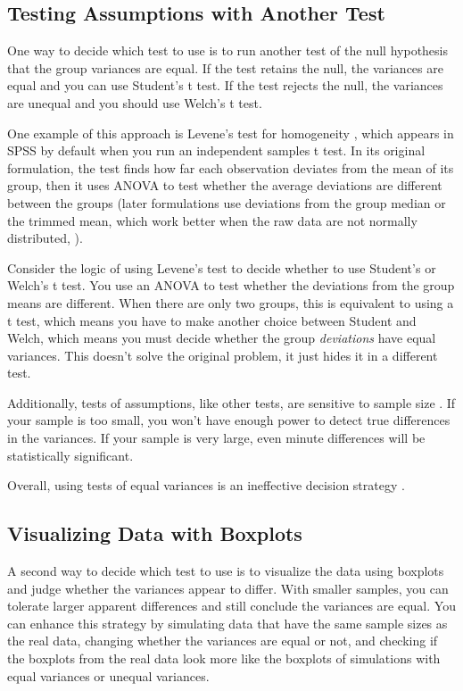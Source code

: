 \documentclass[man, noextraspace, apacite, floatsintext]{apa6}
\begin{document}
\subsection{Testing Assumptions with Another Test}
    One way to decide which test to use
is to run another test of the null hypothesis that the group variances 
are equal. If the test retains the null, the variances are equal and you can use Student's t test. If the test rejects the null, the variances are unequal and you should use Welch's t test.

One example of this approach is Levene's test for homogeneity \cite{Levene1960}, which appears in SPSS by default when you run an independent samples t test.
In its original formulation, the test finds how far each observation deviates from the mean of its group, then it uses ANOVA to test whether the average deviations are different between the groups (later formulations use deviations from the group median or the trimmed mean, which work better when the raw data are not normally distributed, ).

Consider the logic of using Levene's test to decide whether to use Student's or Welch's t 
test. You use an ANOVA to test 
whether the deviations from the group means are different.
When there are only two groups, this is equivalent to using a t test, which means you have to make another choice
between Student and Welch, which means you must decide whether the
group \textit{deviations} have equal variances.
This doesn't solve the original problem, it just hides it in a different test. 

Additionally, tests of assumptions,
like other tests, are sensitive 
to sample size \cite{Gonzalez2008}. If your sample is too small, you won't have enough power to 
detect true differences in the variances. If your sample is very 
large, even minute differences will be statistically significant. 

Overall, using tests of equal variances is an ineffective decision strategy \cite{Zimmerman1996,Zimmerman2004}. 

\subsection{Visualizing Data with Boxplots} 

    A second way to decide which test to use is to visualize the data using boxplots and judge 
whether the variances appear to differ.  With smaller samples, you 
can tolerate larger apparent differences and still conclude the variances are equal. You can enhance this strategy by 
simulating data that have the same sample sizes as the real data, changing whether the variances are equal or not, 
and checking if the boxplots from the real data look more like the boxplots of 
simulations with equal variances or unequal variances. 
\end{document}
